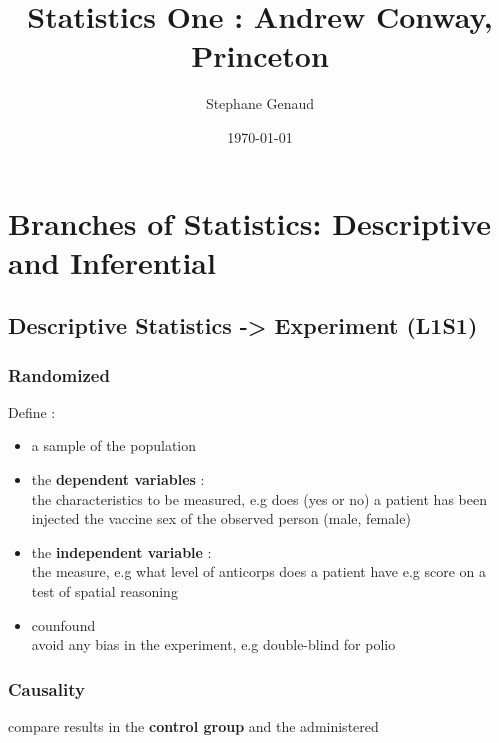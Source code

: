 \documentclass[11pt]{article}
\title{Statistics One : Andrew Conway, Princeton}
\author{Stephane Genaud}
\date{\today}
\begin{document}
\maketitle

\setcounter{tocdepth}{3}
\tableofcontents
\vspace*{1cm}

\section{Branches of Statistics: Descriptive and Inferential}
\label{sec-1}
\subsection{Descriptive Statistics -> Experiment (L1S1)}
\label{sec-1-1}
\subsubsection{Randomized}
\label{sec-1-1-1}

    Define : 
\begin{itemize}

\item a sample of the population
\label{sec-1-1-1-1}%

\item the \textbf{dependent variables} :\\
\label{sec-1-1-1-2}%
the characteristics to be measured, 
     e.g does (yes or no) a patient has been injected the vaccine
         sex of the observed person (male, female)

\item the \textbf{independent variable} :\\
\label{sec-1-1-1-3}%
the measure, e.g what level of anticorps does a patient have
      e.g score on a test of spatial reasoning

\item counfound\\
\label{sec-1-1-1-4}%
avoid any bias in the experiment, e.g double-blind for polio
\end{itemize} %
\subsubsection{Causality}
\label{sec-1-1-2}

    compare results in the \textbf{control group} and the administered
\end{document}
